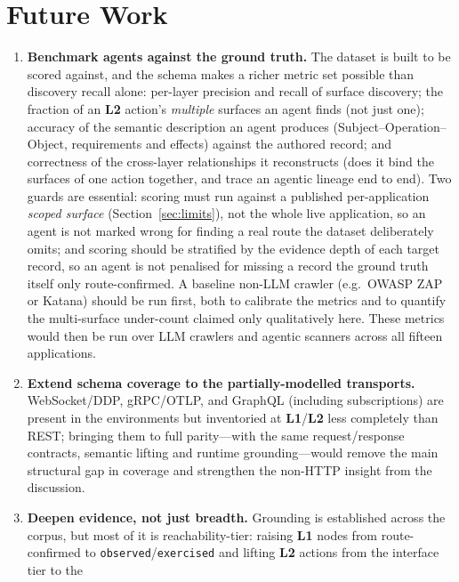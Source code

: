 \documentclass[11pt,a4paper]{article}
\newcommand{\cd}[1]{\lstinline[basicstyle=\ttfamily\small]|#1|}
\renewcommand{\L}[1]{\textbf{L#1}}
\begin{document}
\section{Future Work}\label{sec:future}
\begin{enumerate}[leftmargin=1.6em,itemsep=3pt]
\item \textbf{Benchmark agents against the ground truth.} The dataset is built to be
      scored against, and the schema makes a richer metric set possible than discovery
      recall alone: per-layer precision and recall of surface discovery; the fraction of
      an \L2 action's \emph{multiple} surfaces an agent finds (not just one); accuracy of
      the semantic description an agent produces (Subject--Operation--Object, requirements
      and effects) against the authored record; and correctness of the cross-layer
      relationships it reconstructs (does it bind the surfaces of one action together, and
      trace an agentic lineage end to end). Two guards are essential: scoring must run
      against a published per-application \emph{scoped surface} (Section~\ref{sec:limits}),
      not the whole live application, so an agent is not marked wrong for finding a real
      route the dataset deliberately omits; and scoring should be stratified by the evidence
      depth of each target record, so an agent is not penalised for missing a record the
      ground truth itself only route-confirmed. A baseline non-LLM crawler (e.g.\ OWASP ZAP
      or Katana) should be run first, both to calibrate the metrics and to quantify the
      multi-surface under-count claimed only qualitatively here. These metrics would then be
      run over LLM crawlers and agentic scanners across all fifteen applications.
\item \textbf{Extend schema coverage to the partially-modelled transports.} WebSocket/DDP,
      gRPC/OTLP, and GraphQL (including subscriptions) are present in the environments but
      inventoried at \L1/\L2 less completely than REST; bringing them to full parity---with
      the same request/response contracts, semantic lifting and runtime grounding---would
      remove the main structural gap in coverage and strengthen the non-HTTP insight from
      the discussion.
\item \textbf{Deepen evidence, not just breadth.} Grounding is established across the
      corpus, but most of it is reachability-tier: raising \L1 nodes from route-confirmed
      to \cd{observed}/\cd{exercised} and lifting \L2 actions from the interface tier to the

\end{enumerate}
\end{document}
